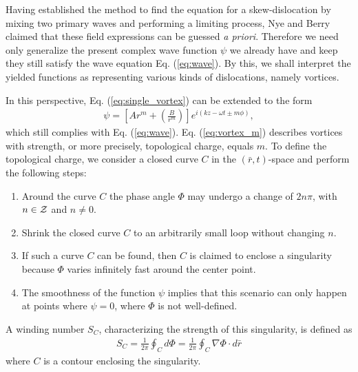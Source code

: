 Having established the method to find the equation for a skew-dislocation by mixing two primary waves and performing a limiting process, Nye and Berry \cite{Ber73} claimed that these field expressions can be guessed \emph{a priori}. Therefore we need only generalize the present complex wave function $\psi$ we already have and keep they still satisfy the wave equation Eq. (\ref{eq:wave}). By this, we shall interpret the yielded functions as representing various kinds of dislocations, namely vortices.

In this perspective, Eq. (\ref{eq:single_vortex}) can be extended to the form
\begin{eqnarray}
	\psi = \left[ Ar^m + \left( \frac{B}{r^m} \right)\right] e^{i(kz - \omega t \pm m \phi)},
	\label{eq:vortex_m}
\end{eqnarray}
which still complies with Eq. (\ref{eq:wave}). Eq. (\ref{eq:vortex_m}) describes vortices with strength, or more precisely, topological charge, equals $m$. To define the topological charge, we consider a closed curve $C$ in the $(\bar{r}, t)$-space and perform the following steps:
\begin{enumerate}
	\item Around the curve $C$ the phase angle $\Phi$ may undergo a change of $2n \pi$, with $n \in {\cal Z}$ and $n \neq 0$.
	\item Shrink the closed curve $C$ to an arbitrarily small loop without changing $n$.
	\item If such a curve $C$ can be found, then $C$ is claimed to enclose a singularity because $\Phi$ varies infinitely fast 
	around the center point.
	\item The smoothness of the function $\psi$ implies that this scenario can only happen at points where $\psi = 0$, where $\Phi$ is not well-defined.
\end{enumerate}
A winding number $S_C$, characterizing the strength of this singularity, is defined as 
\begin{eqnarray}
	S_C = \frac{1}{2 \pi} \oint_C d \Phi = \frac{1}{2 \pi} \oint_C \nabla \Phi \cdot d \bar{r}
\end{eqnarray}
where $C$ is a contour enclosing the singularity.

